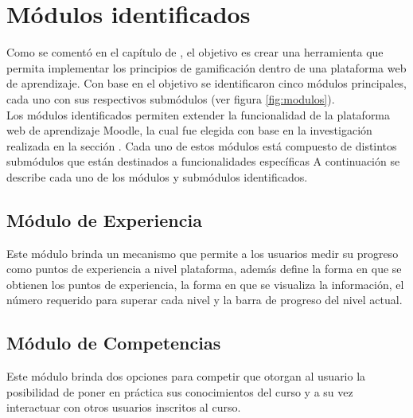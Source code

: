 
\section{Módulos identificados}
\label{analisis:modulos}

 Como se comentó en el capítulo de , el
 objetivo es crear una herramienta que permita implementar los principios de
 gamificación dentro de una plataforma web de aprendizaje. Con base en el objetivo
 se identificaron cinco módulos principales, cada uno con sus
 respectivos submódulos (ver figura \ref{fig:modulos}).\\

 \noindent
 Los módulos identificados permiten extender la funcionalidad de la plataforma web
 de aprendizaje Moodle, la cual fue elegida con base en la investigación realizada en
 la sección . Cada uno de estos módulos está
 compuesto de distintos submódulos que están destinados a funcionalidades específicas
 A continuación se describe cada uno de los módulos y submódulos identificados.






\subsection*{Módulo de Experiencia}

 \noindent
 Este módulo brinda un mecanismo que permite a los usuarios medir su progreso
 como puntos de experiencia a nivel plataforma, además define la forma en que se
 obtienen los puntos de experiencia, la forma en que se visualiza la información,
 el número requerido para superar cada nivel y la barra de progreso del nivel
 actual.

\subsection*{Módulo de Competencias}

 \noindent
 Este módulo brinda dos opciones para competir que otorgan al usuario
 la posibilidad de poner en práctica sus conocimientos del curso y a su vez
 interactuar con otros usuarios inscritos al curso.

